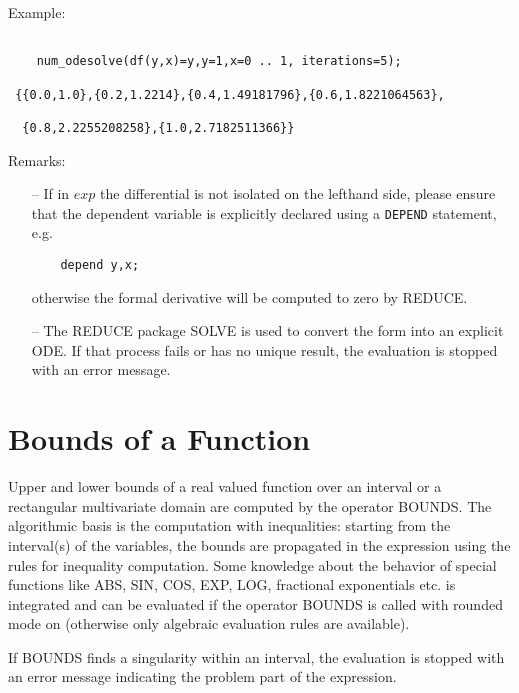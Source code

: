Example:

\begin{verbatim}

    num_odesolve(df(y,x)=y,y=1,x=0 .. 1, iterations=5);
 
 {{0.0,1.0},{0.2,1.2214},{0.4,1.49181796},{0.6,1.8221064563},

  {0.8,2.2255208258},{1.0,2.7182511366}}

\end{verbatim}

Remarks:
 
\begin{enumerate}

\item[--] If in $exp$ the differential is not isolated on the lefthand side, 
please ensure that the dependent variable is explicitly declared
using a \verb+DEPEND+ statement, e.g.
 
\begin{verbatim}
    depend y,x;
\end{verbatim}
 
otherwise the formal derivative will be computed to zero by REDUCE.

\item[--] The REDUCE package SOLVE is used to convert the form into
an explicit ODE. If that process fails or has no unique result,
the evaluation is stopped with an error message.

\end{enumerate}

\section{Bounds of a Function}

Upper and lower bounds of a real valued function over an
interval or a rectangular multivariate domain are computed
by the operator BOUNDS. The algorithmic basis is the computation
with inequalities: starting from the interval(s) of the
variables, the bounds are propagated in the expression
using the rules for inequality computation. Some knowledge
about the behavior of special functions like ABS, SIN, COS, EXP, LOG,
fractional exponentials etc. is integrated and can be evaluated
if the operator BOUNDS is called with rounded mode on 
(otherwise only algebraic evaluation rules are available).
 
If BOUNDS finds a singularity within an interval, the evaluation
is stopped with an error message indicating the problem part
of the expression.
 

